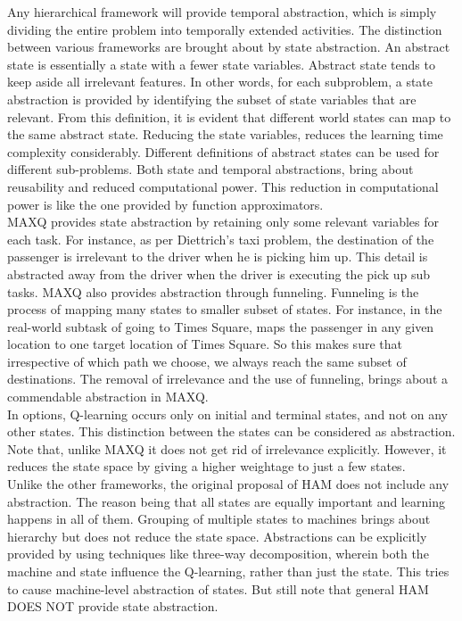 Any hierarchical framework will provide temporal abstraction, which is simply dividing the entire problem into temporally extended activities. The distinction between various frameworks are brought about by state abstraction. An abstract state is essentially a state with a fewer state variables. Abstract state tends to keep aside all irrelevant features. In other words, for each subproblem, a state abstraction is provided by identifying the subset of state variables that are relevant. From this definition, it is evident that different world states can map to the same abstract state. Reducing the state variables, reduces the learning time complexity considerably. Different definitions of abstract states can be used for different sub-problems. Both state and temporal abstractions, bring about reusability and reduced computational power. This reduction in computational power is like the one provided by function approximators. \\

MAXQ provides state abstraction by retaining only some relevant variables for each task. For instance, as per Diettrich’s taxi problem, the destination of the passenger is irrelevant to the driver when he is picking him up. This detail is abstracted away from the driver when the driver is executing the pick up sub tasks. MAXQ also provides abstraction through funneling. Funneling is the process of mapping many states to smaller subset of states. For instance, in the real-world subtask of going to Times Square, maps the passenger in any given location to one target location of Times Square. So this makes sure that irrespective of which path we choose, we always reach the same subset of destinations. The removal of irrelevance and the use of funneling, brings about a commendable abstraction in MAXQ. \\

In options, Q-learning occurs only on initial and terminal states, and not on any other states. This distinction between the states can be considered as abstraction. Note that, unlike MAXQ it does not get rid of irrelevance explicitly. However, it reduces the state space by giving a higher weightage to just a few states. \\

Unlike the other frameworks, the original proposal of HAM does not include any abstraction. The reason being that all states are equally important and learning happens in all of them. Grouping of multiple states to machines brings about hierarchy but does not reduce the state space. Abstractions can be explicitly provided by using techniques like three-way decomposition, wherein both the machine and state influence the Q-learning, rather than just the state. This tries to cause machine-level abstraction of states. But still note that general HAM DOES NOT provide state abstraction. \\


